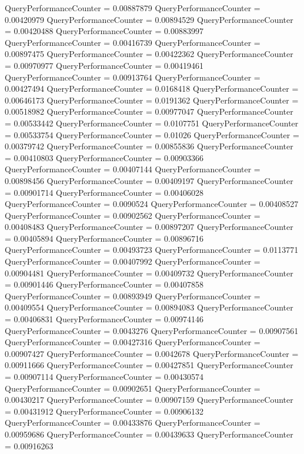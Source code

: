 \documentclass[9pt]{article}
\theoremstyle{plain}
\theoremstyle{definition}
\theoremstyle{remark}
\numberwithin{equation}{section}
\begin{document}
QueryPerformanceCounter  =  0.00887879
QueryPerformanceCounter  =  0.00420979
QueryPerformanceCounter  =  0.00894529
QueryPerformanceCounter  =  0.00420488
QueryPerformanceCounter  =  0.00883997
QueryPerformanceCounter  =  0.00416739
QueryPerformanceCounter  =  0.00897475
QueryPerformanceCounter  =  0.00422362
QueryPerformanceCounter  =  0.00970977
QueryPerformanceCounter  =  0.00419461
QueryPerformanceCounter  =  0.00913764
QueryPerformanceCounter  =  0.00427494
QueryPerformanceCounter  =  0.0168418
QueryPerformanceCounter  =  0.00646173
QueryPerformanceCounter  =  0.0191362
QueryPerformanceCounter  =  0.00518982
QueryPerformanceCounter  =  0.00977047
QueryPerformanceCounter  =  0.00533442
QueryPerformanceCounter  =  0.0107751
QueryPerformanceCounter  =  0.00533754
QueryPerformanceCounter  =  0.01026
QueryPerformanceCounter  =  0.00379742
QueryPerformanceCounter  =  0.00855836
QueryPerformanceCounter  =  0.00410803
QueryPerformanceCounter  =  0.00903366
QueryPerformanceCounter  =  0.00407144
QueryPerformanceCounter  =  0.00898456
QueryPerformanceCounter  =  0.00409197
QueryPerformanceCounter  =  0.00901714
QueryPerformanceCounter  =  0.00406028
QueryPerformanceCounter  =  0.0090524
QueryPerformanceCounter  =  0.00408527
QueryPerformanceCounter  =  0.00902562
QueryPerformanceCounter  =  0.00408483
QueryPerformanceCounter  =  0.00897207
QueryPerformanceCounter  =  0.00405894
QueryPerformanceCounter  =  0.00896716
QueryPerformanceCounter  =  0.00493723
QueryPerformanceCounter  =  0.0113771
QueryPerformanceCounter  =  0.00407992
QueryPerformanceCounter  =  0.00904481
QueryPerformanceCounter  =  0.00409732
QueryPerformanceCounter  =  0.00901446
QueryPerformanceCounter  =  0.00407858
QueryPerformanceCounter  =  0.00893949
QueryPerformanceCounter  =  0.00409554
QueryPerformanceCounter  =  0.00894083
QueryPerformanceCounter  =  0.00406831
QueryPerformanceCounter  =  0.00974146
QueryPerformanceCounter  =  0.0043276
QueryPerformanceCounter  =  0.00907561
QueryPerformanceCounter  =  0.00427316
QueryPerformanceCounter  =  0.00907427
QueryPerformanceCounter  =  0.0042678
QueryPerformanceCounter  =  0.00911666
QueryPerformanceCounter  =  0.00427851
QueryPerformanceCounter  =  0.00907114
QueryPerformanceCounter  =  0.00430574
QueryPerformanceCounter  =  0.00902651
QueryPerformanceCounter  =  0.00430217
QueryPerformanceCounter  =  0.00907159
QueryPerformanceCounter  =  0.00431912
QueryPerformanceCounter  =  0.00906132
QueryPerformanceCounter  =  0.00433876
QueryPerformanceCounter  =  0.00959686
QueryPerformanceCounter  =  0.00439633
QueryPerformanceCounter  =  0.00916263
\end{document}
